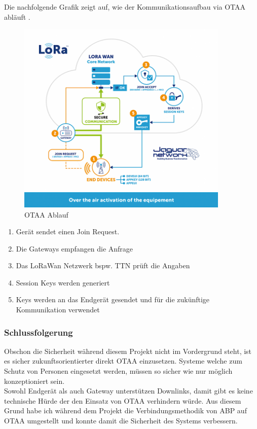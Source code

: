 \documentclass[11pt,english,german]{report}
\theoremstyle{definition}
\begin{document}
\newpage
\noindent
Die nachfolgende Grafik zeigt auf, wie der Kommunikationsaufbau via OTAA abläuft \cite{jaguar}.
\begin{figure}[H]
	\centering
	\includegraphics[width=0.9\textwidth]{img/otaa_schema.png}
	\caption[OTAA Ablauf]
	{OTAA Ablauf}
\end{figure}

\begin{enumerate}
	\item Gerät sendet einen Join Request.
	\item Die Gateways empfangen die Anfrage
	\item Das LoRaWan Netzwerk  bspw. TTN prüft die Angaben
	\item Session Keys werden generiert
	\item Keys werden an das Endgerät gesendet und für die zukünftige Kommunikation verwendet
\end{enumerate}

\newpage
\subsubsection{Schlussfolgerung}
Obschon die Sicherheit während diesem Projekt nicht im Vordergrund steht, ist es sicher zukunftsorientierter direkt OTAA einzusetzen. Systeme welche zum Schutz von Personen eingesetzt werden, müssen so sicher wie nur möglich konzeptioniert sein.\\[0.3cm]
Sowohl Endgerät als auch Gateway unterstützen Downlinks, damit gibt es keine technische Hürde der den Einsatz von OTAA verhindern würde. Aus diesem Grund habe ich während dem Projekt die Verbindungsmethodik von ABP auf OTAA umgestellt und konnte damit die Sicherheit des Systems verbessern.
\end{document}
